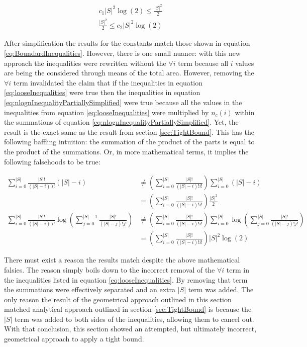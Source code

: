 \documentclass{article}
\begin{document}
\begin{equation}
	\begin{split}
		c_1|S|^2\log(2)\le \frac{|S|^2}{2} \\
		\frac{|S|^2}{2}\le c_2|S|^2\log(2)
	\end{split}
	\label{eq:looseInequalitiesArea}
\end{equation}

After simplification the results for the constants match those shown in equation \ref{eq:BoundardInequalities}. However, there is one small nuance: with this new approach the inequalities were rewritten without the $\forall i$ term because all $i$ values are being the considered through means of the total area. However, removing the $\forall i$ term invalidated the claim that if the inequalities in equation \ref{eq:looseInequalities} were true then the inequalities in equation \ref{eq:nlognInequalityPartiallySimplified} were true because all the values in the inequalities from equation \ref{eq:looseInequalities} were multiplied by $n_c(i)$ within the summations of equation \ref{eq:nlognInequalityPartiallySimplified}. Yet, the result is the exact same as the result from section \ref{sec:TightBound}. This has the following baffling intuition: the summation of the product of the parts is equal to the product of the summations. Or, in more mathematical terms, it implies the following falsehoods to be true:

\begin{equation}
	\begin{split}
		\sum_{i=0}^{|S|}\frac{|S|!}{(|S|-i)!i!}\left(|S| -i\right)
		&\ne
		\left( \sum_{i=0}^{|S|}\frac{|S|!}{(|S|-i)!i!} \right)\sum_{i=0}^{|S|}\left(|S| -i\right)
		\\
		&=
		\left( \sum_{i=0}^{|S|}\frac{|S|!}{(|S|-i)!i!} \right)\frac{|S|^2}{2}
		\\
		\sum_{i=0}^{|S|}\frac{|S|!}{(|S|-i)!i!}
        \log \left( \sum_{j=0}^{|S|-1}\frac{|S|!}{(|S|-j)!j!} \right)
        &\ne
        \left( \sum_{i=0}^{|S|}\frac{|S|!}{(|S|-i)!i!} \right)
        \sum_{i=0}^{|S|}
        \log \left( \sum_{j=0}^{|S|}\frac{|S|!}{(|S|-j)!j!} \right)
        \\
        &=
        \left( \sum_{i=0}^{|S|}\frac{|S|!}{(|S|-i)!i!} \right)
        |S|^2\log(2)
	\end{split}
\end{equation}

There must exist a reason the results match despite the above mathematical falsies. The reason simply boils down to the incorrect removal of the $\forall i$ term in the inequalities listed in equation \ref{eq:looseInequalities}. By removing that term the summations were effectively separated and an extra $|S|$ term was added. The only reason the result of the geometrical approach outlined in this section matched analytical approach outlined in section \ref{sec:TightBound} is because the $|S|$ term was added to both sides of the inequalities, allowing them to cancel out. With that conclusion, this section showed an attempted, but ultimately incorrect, geometrical approach to apply a tight bound.
\end{document}
